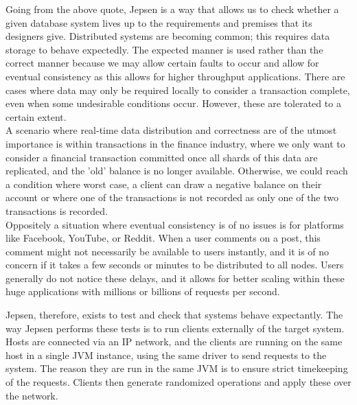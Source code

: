 \documentclass[a4paper,10pt,titlepage]{report}
\begin{document}
Going from the above quote, Jepsen is a way that allows us to check whether a given database system lives up to the requirements and premises that its designers give. Distributed systems are becoming common; this requires data storage to behave expectedly. The expected manner is used rather than the correct manner because we may allow certain faults to occur and allow for eventual consistency as this allows for higher throughput applications. There are cases where data may only be required locally to consider a transaction complete, even when some undesirable conditions occur. However, these are tolerated to a certain extent. \\

A scenario where real-time data distribution and correctness are of the utmost importance is within transactions in the finance industry, where we only want to consider a financial transaction committed once all shards of this data are replicated, and the 'old' balance is no longer available. Otherwise, we could reach a condition where worst case, a client can draw a negative balance on their account or where one of the transactions is not recorded as only one of the two transactions is recorded.\\

Oppositely a situation where eventual consistency is of no issues is for platforms like Facebook, YouTube, or Reddit. When a user comments on a post, this comment might not necessarily be available to users instantly, and it is of no concern if it takes a few seconds or minutes to be distributed to all nodes. Users generally do not notice these delays, and it allows for better scaling within these huge applications with millions or billions of requests per second.\\

\vspace{5mm}

Jepsen, therefore, exists to test and check that systems behave expectantly. The way Jepsen performs these tests is to run clients externally of the target system. Hosts are connected via an IP network, and the clients are running on the same host in a single JVM instance, using the same driver to send requests to the system. The reason they are run in the same JVM is to ensure strict timekeeping of the requests. Clients then generate randomized operations and apply these over the network.\\
\end{document}
